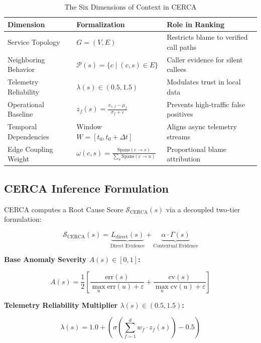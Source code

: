 \documentclass[conference]{IEEEtran}
\begin{document}
\begin{table}[htbp]
\caption{The Six Dimensions of Context in CERCA}
\label{tab:context}
\begin{tabular}{p{1.8cm}p{2.2cm}p{3.3cm}}
\toprule
\textbf{Dimension} & \textbf{Formalization} & \textbf{Role in Ranking} \\
\midrule
Service Topology & $G = (V, E)$ & Restricts blame to verified call paths \\
Neighboring Behavior & $\mathcal{P}(s)=\{c \mid (c,s) \in E\}$ & Caller evidence for silent callees \\
Telemetry Reliability & $\lambda(s) \in (0.5, 1.5)$ & Modulates trust in local data \\
Operational Baseline & $z_f(s) = \frac{x_{s,f} - \mu_f}{\sigma_f + \varepsilon}$ & Prevents high-traffic false positives \\
Temporal Dependencies & Window $W=[t_0, t_0+\Delta t]$ & Aligns async telemetry streams \\
Edge Coupling Weight & $\omega(c,s)=\frac{\text{Spans}(c{\to}s)}{\sum_u\text{Spans}(c{\to}u)}$ & Proportional blame attribution \\
\bottomrule
\end{tabular}
\end{table}

\subsection{CERCA Inference Formulation}

CERCA computes a Root Cause Score $\mathcal{S}_{\text{CERCA}}(s)$ via a decoupled two-tier formulation:

\begin{equation}
\mathcal{S}_{\text{CERCA}}(s) = \underbrace{L_{\text{direct}}(s)}_{\text{Direct Evidence}} + \underbrace{\alpha \cdot \Gamma(s)}_{\text{Contextual Evidence}}
\label{eq:cerca_main}
\end{equation}

\noindent\textbf{Base Anomaly Severity $A(s) \in [0,1]$:}

\begin{equation}
A(s) = \frac{1}{2}\!\left[\frac{\text{err}(s)}{\max_{u}\text{err}(u)+\varepsilon} + \frac{\text{cv}(s)}{\max_{u}\text{cv}(u)+\varepsilon}\right]
\end{equation}

\noindent\textbf{Telemetry Reliability Multiplier $\lambda(s) \in (0.5, 1.5)$:}

\begin{equation}
\lambda(s) = 1.0 + \left(\sigma\!\left(\sum_{f=1}^{d} w_f \cdot z_f(s)\right) - 0.5\right)
\label{eq:lambda}
\end{equation}
\end{document}

